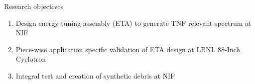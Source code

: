 \documentclass[xcolor=x11names,compress]{beamer}
\renewcommand{\(}{\begin{columns}}
\renewcommand{\)}{\end{columns}}
\newcommand{\<}[1]{\begin{column}{#1}}
\renewcommand{\>}{\end{column}}
\begin{document}
\begin{frame}{Research objectives}
    \vspace{0.3cm}
    \begin{enumerate}
      \item Design energy tuning assembly (ETA) to generate TNF relevant spectrum at NIF
      \item Piece-wise application specific validation of ETA design at LBNL 88-Inch Cyclotron
      \item Integral test and creation of synthetic debris at NIF
    \end{enumerate}
  \vspace*{-1.5em}
  \renewcommand*{\thesubfigure}{}
  \begin{figure}[htp]
    \centering
    \subcapcentertrue
    \vspace{0.3cm}
    \hspace{0.0cm}
  \end{figure}
\end{frame}
\end{document}
